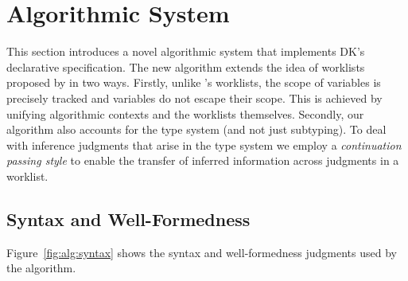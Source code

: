 \section{Algorithmic System}

This section introduces a novel algorithmic system that implements 
DK's declarative specification. The new algorithm extends the idea
of worklists proposed by \citet{itp2018} in two ways. Firstly,
unlike \citet{itp2018}'s worklists, the scope of variables is precisely tracked
and variables do not escape their scope. This is achieved by unifying algorithmic contexts and the worklists themselves.
Secondly, our algorithm also
accounts for the type system (and not just subtyping). To deal with
inference judgments that arise in the type system we employ a \emph{continuation
passing style} to enable the transfer of inferred information across
judgments in a worklist.

\subsection{Syntax and Well-Formedness}

Figure~\ref{fig:alg:syntax} shows the syntax and well-formedness judgments used by the algorithm.

